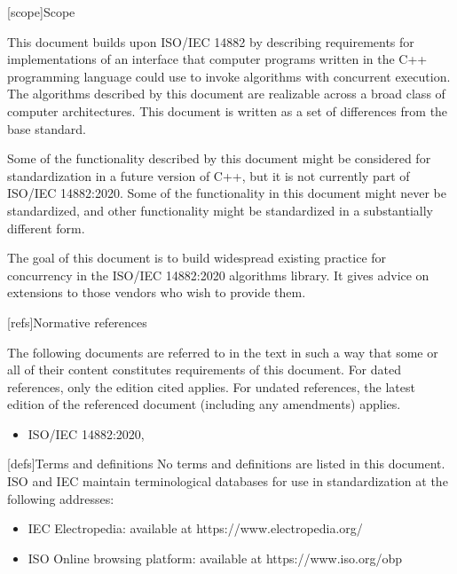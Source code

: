
[scope]{Scope}

This document builds upon ISO/IEC 14882
by describing requirements for implementations of an interface that computer programs written in the C++ programming language could use to invoke algorithms with concurrent execution. The algorithms described by this document are realizable across a broad class of computer architectures.
This document is written as a set of differences from the base standard.

Some of the functionality described by this document might be considered for standardization in a future version of C++, but it is not currently part of ISO/IEC 14882:2020. Some of the functionality in this document might never be standardized, and other functionality might be standardized in a substantially different form.

The goal of this document is to build widespread existing practice for concurrency in the ISO/IEC 14882:2020 algorithms library. It gives advice on extensions to those vendors who wish to provide them.

[refs]{Normative references}

The following documents are referred to in the text in such a way that some or all of their content constitutes requirements of this document. For dated references, only the edition cited applies. For undated references, the latest edition of the referenced document (including any amendments) applies.

\begin{itemize}
\item ISO/IEC 14882:2020, 
\end{itemize}



[defs]{Terms and definitions}
{}%
No terms and definitions are listed in this document. ISO and IEC maintain
terminological databases for use in standardization at the following addresses:

\begin{itemize}
    \item IEC Electropedia: available at https://www.electropedia.org/
    \item ISO Online browsing platform: available at https://www.iso.org/obp
\end{itemize}


